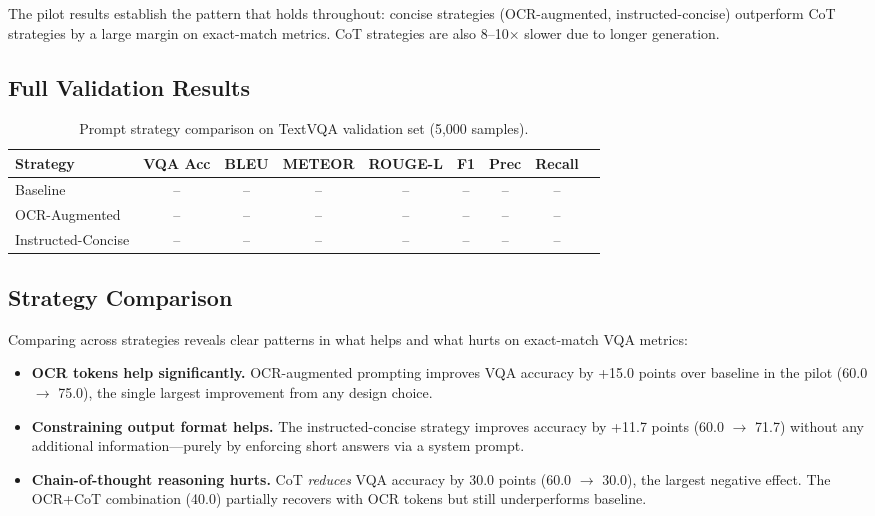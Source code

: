 \documentclass[11pt]{article}
\begin{document}
The pilot results establish the pattern that holds throughout: concise strategies (OCR-augmented, instructed-concise) outperform CoT strategies by a large margin on exact-match metrics. CoT strategies are also 8--10$\times$ slower due to longer generation.

\subsection{Full Validation Results}

\begin{table}[H]
\centering
\caption{Prompt strategy comparison on TextVQA validation set (5,000 samples).}
\label{tab:full_results}
\begin{tabular}{lcccccccc}
\toprule
\textbf{Strategy} & \textbf{VQA Acc} & \textbf{BLEU} & \textbf{METEOR} & \textbf{ROUGE-L} & \textbf{F1} & \textbf{Prec} & \textbf{Recall} \\
\midrule
Baseline           & --   & --   & --    & --    & --   & --   & -- \\
OCR-Augmented      & --   & --   & --    & --    & --   & --   & -- \\
Instructed-Concise & --   & --   & --    & --    & --   & --   & -- \\
\bottomrule
\end{tabular}
\end{table}



\subsection{Strategy Comparison}

Comparing across strategies reveals clear patterns in what helps and what hurts on exact-match VQA metrics:

\begin{itemize}[nosep]
  \item \textbf{OCR tokens help significantly.} OCR-augmented prompting improves VQA accuracy by +15.0 points over baseline in the pilot (60.0 $\to$ 75.0), the single largest improvement from any design choice.
  \item \textbf{Constraining output format helps.} The instructed-concise strategy improves accuracy by +11.7 points (60.0 $\to$ 71.7) without any additional information---purely by enforcing short answers via a system prompt.
  \item \textbf{Chain-of-thought reasoning hurts.} CoT \textit{reduces} VQA accuracy by 30.0 points (60.0 $\to$ 30.0), the largest negative effect. The OCR+CoT combination (40.0) partially recovers with OCR tokens but still underperforms baseline.
\end{itemize}
\end{document}
